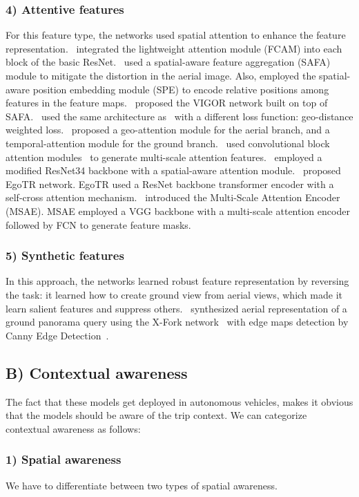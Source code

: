 \documentclass[10pt,letterpaper]{article}
\begin{document}
\subsubsection*{4) Attentive features}
For this feature type, the networks used spatial attention to enhance the feature representation.~\cite{bib45} integrated the lightweight attention module (FCAM) into each block of the basic ResNet.~\cite{bib46} used a spatial-aware feature aggregation (SAFA) module to mitigate the distortion in the aerial image. Also, employed the spatial-aware position embedding module (SPE) to encode relative positions among features in the feature maps.~\cite{bib5} proposed the VIGOR network built on top of SAFA.~\cite{bib47,bib17} used the same architecture as~\cite{bib46} with a different loss function: geo-distance weighted loss.~\cite{bib24} proposed a geo-attention module for the aerial branch, and a temporal-attention module for the ground branch.~\cite{bib8} used convolutional block attention modules~\cite{bib48} to generate multi-scale attention features.~\cite{bib18} employed a modified ResNet34 backbone with a spatial-aware attention module.~\cite{bib19} proposed EgoTR network. EgoTR used a ResNet backbone transformer encoder with a self-cross attention mechanism.~\cite{bib49} introduced the Multi-Scale Attention Encoder (MSAE). MSAE employed a VGG backbone with a multi-scale attention encoder followed by FCN to generate feature masks.

\subsubsection*{5) Synthetic features}
In this approach, the networks learned robust feature representation by reversing the task: it learned how to create ground view from aerial views, which made it learn salient features and suppress others.~\cite{bib50} synthesized aerial representation of a ground panorama query using the X-Fork network~\cite{bib51} with edge maps detection by Canny Edge Detection~\cite{bib52}.

\subsection*{B) Contextual awareness}
The fact that these models get deployed in autonomous vehicles, makes it obvious that the models should be aware of the trip context. We can categorize contextual awareness as follows:

\subsubsection*{1) Spatial awareness}
We have to differentiate between two types of spatial awareness.
\end{document}

